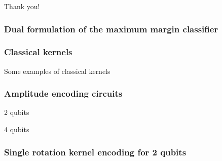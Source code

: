 \documentclass{beamer}
\begin{document}
    \begin{frame}[noframenumbering]
        
        \centering
        Thank you!
        
        
    \end{frame}
    
    \begin{frame}[noframenumbering]
        \frametitle{Dual formulation of the maximum margin classifier}
        
        
        
    \end{frame}
    

    \begin{frame}[noframenumbering]
        \frametitle{Classical kernels}
    
        Some examples of classical kernels
    
    \end{frame}

    \begin{frame}[noframenumbering]
        \frametitle{Amplitude encoding circuits}
    
        2 qubits

        4 qubits
    
    \end{frame}

    \begin{frame}[noframenumbering]
        \frametitle{Single rotation kernel encoding for 2 qubits}
    
        
    
    \end{frame}
        
        
\end{document}
